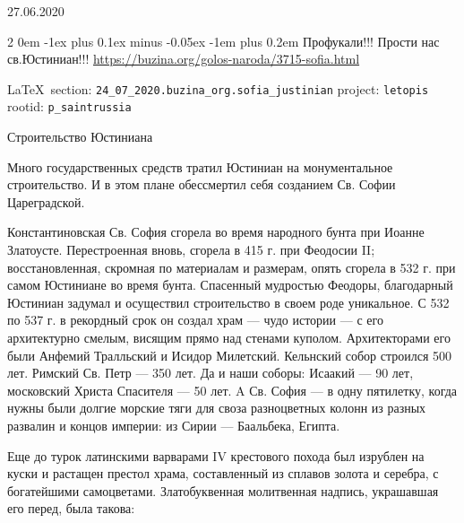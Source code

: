 \documentclass[a4paper,11pt]{extreport}
\makeatletter
\renewcommand\subsection{%
  \clearpage
    \@startsection{subsection}%
    {2}%
    {0em}%
    {-1ex plus 0.1ex minus -0.05ex}%
    {-1em plus 0.2em}%
    {\scshape\bfseries\Large}%
}
\makeatother
\begin{document}
27.06.2020
\restorecr

 
 
\subsection{Профукали!!! Прости нас св.Юстиниан!!!}
\label{sec:24_07_2020.buzina_org.sofia_justinian}
\url{https://buzina.org/golos-naroda/3715-sofia.html}
  
\vspace{0.5cm}
 {\ifDEBUG\small\LaTeX~section: \verb|24_07_2020.buzina_org.sofia_justinian| project: \verb|letopis| rootid: \verb|p_saintrussia| \fi}
\vspace{0.5cm}


Строительство Юстиниана

Много государственных средств тратил Юстиниан на монументальное строительство.
И в этом плане обессмертил себя созданием Св. Софии Цареградской.

Константиновская Св. София сгорела во время народного бунта при Иоанне
Златоусте. Перестроенная вновь, сгорела в 415 г. при Феодосии II;
восстановленная, скромная по материалам и размерам, опять сгорела в 532 г. при
самом Юстиниане во время бунта. Спасенный мудростью Феодоры, благодарный
Юстиниан задумал и осуществил строительство в своем роде уникальное. С 532 по
537 г. в рекордный срок он создал храм --- чудо истории --- с его архитектурно
смелым, висящим прямо над стенами куполом. Архитекторами его были Анфемий
Тралльский и Исидор Милетский. Кельнский собор строился 500 лет. Римский Св.
Петр --- 350 лет. Да и наши соборы: Исаакий --- 90 лет, московский Христа Спасителя
--- 50 лет. A Св. София --- в одну пятилетку, когда нужны были долгие морские тяги
для своза разноцветных колонн из разных развалин и концов империи: из Сирии ---
Баальбека, Египта.

Еще до турок латинскими варварами IV крестового похода был изрублен на куски и
растащен престол храма, составленный из сплавов золота и серебра, с богатейшими
самоцветами. Златобуквенная молитвенная надпись, украшавшая его перед, была
такова:
\end{document}
